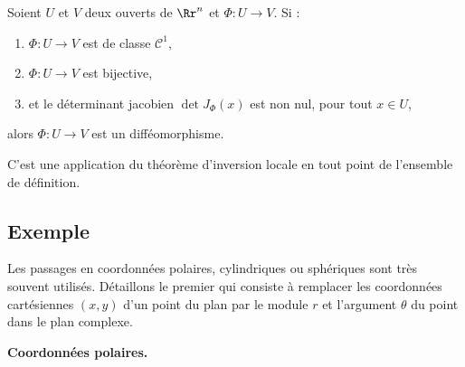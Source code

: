 \documentclass[11pt, class=report,crop=false]{standalone}
\begin{document}
\begin{theoreme}
Soient $U$ et $V$ deux ouverts de $\Rr^n$ et $\Phi:U\to V$.
Si :
\begin{enumerate}
     \item $\Phi:U\to V$ est de classe $\mathcal{C}^1$,
     \item $\Phi:U\to V$ est bijective,
     \item et le déterminant jacobien $\det J_\Phi(x)$ est non nul, pour tout $x \in U$, 
    \end{enumerate}
    alors $\Phi : U \to V$ est un difféomorphisme.
\end{theoreme}

C'est une application du théorème d'inversion locale en tout point de l'ensemble de définition.

\subsection{Exemple}



Les passages en coordonnées polaires, cylindriques ou sphériques sont très souvent utilisés. Détaillons le premier qui consiste à remplacer les coordonnées cartésiennes $(x,y)$ d'un point du plan par le module $r$ et l'argument $\theta$ du point dans le plan complexe.

  
\textbf{Coordonnées polaires.}
\end{document}
